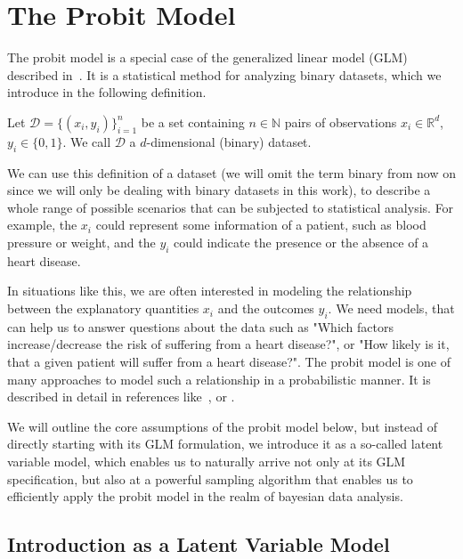 \section{The Probit Model}

The probit model is a special case of the generalized linear model (GLM)
described in~\cite{glm-nelder}.
It is a statistical method for analyzing binary datasets,
which we introduce in the following definition.

\begin{definition}[Dataset]
    Let $\mathcal{D} = \{(x_i, y_i)\}_{i=1}^n$ be a set containing
    $n \in \mathbb{N}$ pairs of observations $x_i \in \mathbb{R}^d$,
    $y_i \in \{0, 1\}$.
    We call $\mathcal{D}$ a $d$-dimensional (binary) dataset.
\end{definition}

\noindent We can use this definition of a dataset
(we will omit the term binary from now on since we will only be dealing
with binary datasets in this work), to describe a whole range of possible scenarios
that can be subjected to statistical analysis.
For example, the $x_i$ could represent some information of a patient, such as
blood pressure or weight, and the $y_i$ could indicate the presence or
the absence of a heart disease.

In situations like this, we are often interested in modeling the
relationship between the explanatory quantities $x_i$ and the
outcomes $y_i$.
We need models, that can help us to answer questions about the data
such as "Which factors increase/decrease the risk of suffering from a heart disease?",
or "How likely is it, that a given patient will suffer from a heart disease?".
The probit model is one of many approaches to model such a
relationship in a probabilistic manner.
It is described in detail in references like~\cite{glm-nelder},
\cite{glm-agresti} or \cite{regression-fahrmeir}.

We will outline the core assumptions of the probit model below,
but instead of directly starting with its GLM formulation, we introduce
it as a so-called latent variable model, which enables us to
naturally arrive not only at its GLM specification, but also
at a powerful sampling algorithm that enables us to efficiently apply
the probit model in the realm of bayesian data analysis.

\subsection{Introduction as a Latent Variable Model}
\label{sec:probit-introduction}

